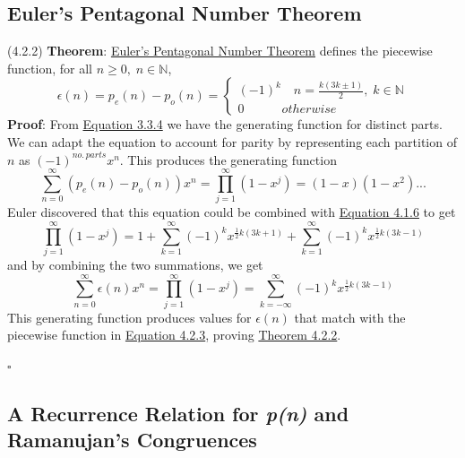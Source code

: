 \documentclass{article}
\newcommand{\separate}[1] {\vspace{#1 pt}\noindent}
\newcommand{\N}{\mathbb{N}}
\newcommand{\theorem}[2]{(#1) \textbf{Theorem}: #2}
\newcommand{\proof}[1]{\textbf{Proof}: #1 \begin{flushright}\(\square\)\end{flushright}}
\begin{document}
\subsection{Euler's Pentagonal Number Theorem}

\separate{5}\theorem{4.2.2}{\underline{Euler's Pentagonal Number Theorem} defines the piecewise function, for all \(n \geq 0, \; n \in \N\),}\label{thm:4.2.2}
\begin{equation}\tag{4.2.3}\label{eq:4.2.3}
    \epsilon(n) = p_e(n) - p_o(n) = 
    \begin{cases}
        (-1)^k \quad n = \frac{k(3k\pm1)}{2}, \;k \in \N \\
        0 \quad\quad\quad otherwise
    \end{cases}
\end{equation}
\proof{From \hyperref[eq:3.3.4]{Equation 3.3.4} we have the generating function for distinct parts. We can adapt the equation to account for parity by representing each partition of \(n\) as \((-1)^{no. \, parts}x^n\). This produces the generating function
\begin{equation}\tag{4.2.4}\label{eq:4.2.4}
    \sum^\infty_{n=0} \left(p_e(n)-p_o(n)\right)x^n =  \prod^\infty_{j=1}\left(1-x^j\right) = (1-x)(1-x^2)...
\end{equation}
Euler discovered that this equation could be combined with \hyperref[eq:4.1.6]{Equation 4.1.6} to get 
\begin{equation}\tag{4.2.5}\label{eq:4.2.5}
    \prod^\infty_{j=1}(1-x^j) = 1 + \sum^\infty_{k=1}(-1)^kx^{\frac{1}{2}k(3k+1)} + \sum^\infty_{k=1}(-1)^kx^{\frac{1}{2}k(3k-1)}
\end{equation}
and by combining the two summations, we get
\begin{equation}\tag{4.2.6}\label{eq:4.2.6}
    \sum^\infty_{n=0}\epsilon(n)x^n = \prod^\infty_{j=1}(1-x^j) = \sum^\infty_{k=-\infty}(-1)^kx^{\frac{1}{2}k(3k-1)}
\end{equation}
This generating function produces values for \(\epsilon(n)\) that match with the piecewise function in \hyperref[eq:4.2.3]{Equation 4.2.3}, proving \hyperref[thm:4.2.2]{Theorem 4.2.2}.}

\subsection{A Recurrence Relation for \textit{p(n)} and Ramanujan's Congruences}
\end{document}
